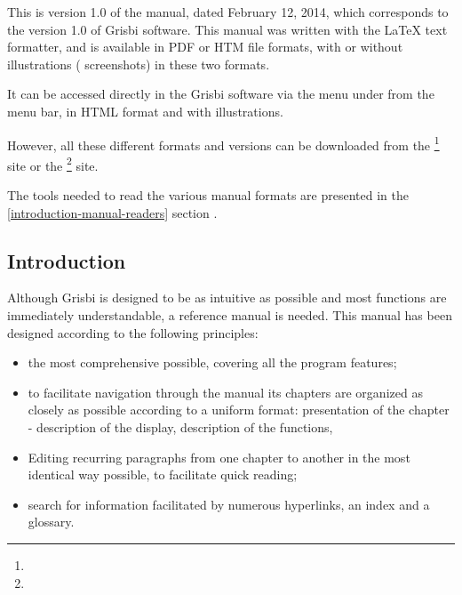 This is version \actuality{} 1.0 of the manual, dated \actuality{} February 12, 2014, which corresponds to the version 1.0 of Grisbi software.  This manual was written with the \gls{LaTeX}  \gls{text formatter}, and is available in PDF or HTM \gls{file formats}, with or without illustrations ( screenshots) in these two formats.

It can be accessed directly in the Grisbi software via the menu under  from the menu bar, in HTML format and with illustrations.

However, all these different formats and versions can be downloaded from the  \footnote{ \urlGrisbi{}} site or the  \footnote{ \urlSourceForgeDocumentation{}} site.

The tools needed to read the various manual formats are presented in the  \vref{introduction-manual-readers} section .

\subsection{Introduction \label{introduction-manual-presentation}}

Although Grisbi is designed to be as intuitive as possible and most functions are immediately understandable, a reference manual is needed. This manual has been designed according to the following principles:

\begin{itemize}

\item the most comprehensive possible, covering all the program features;

\item to facilitate navigation through the manual its chapters are organized as closely as possible according to a uniform format: presentation of the chapter - description of the display, description of the functions, 

\item Editing recurring paragraphs from one chapter to another in the most identical way possible, to facilitate quick reading;

\item search for information facilitated by numerous \gls{hyperlinks}, an index and a glossary.

\end{itemize}


